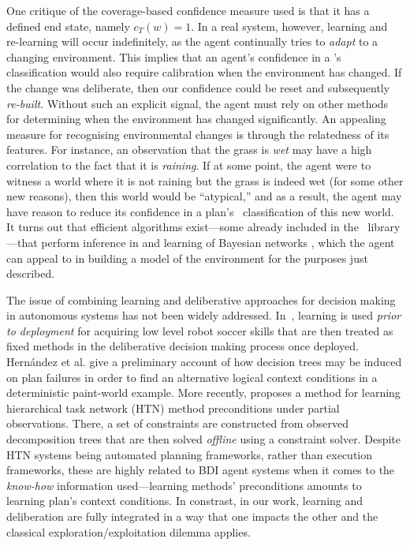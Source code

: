 One critique of the coverage-based confidence measure used is that it has a
defined end state, namely $c_T(w)=1$. In a real system, however, learning and
re-learning will occur indefinitely, as the agent continually tries to
\emph{adapt} to a changing environment. This implies that an agent's confidence
in a \dt's classification would also require calibration when the environment has
changed. If the change was deliberate, then our confidence could be reset and
subsequently \textit{re-built}. Without such an explicit signal, the agent must
rely on other methods for determining when the environment has changed
significantly.
An appealing measure for recognising environmental changes is through the
relatedness of its features. For instance, an observation that the grass is
\textit{wet} may have a high correlation to the fact that it is \textit{raining}.
If at some point, the agent were to witness a world where it is not raining but
the grass is indeed wet (for some other new reasons), then this world would be
``atypical,''  and as a result, the agent may have reason to reduce its
confidence in a plan's \dt\ classification of this new world.
It turns out that efficient algorithms exist---some already included in the
\weka\ library---that perform inference in and learning of Bayesian networks
\cite{Mitchell97:ML}, which the agent can appeal to in building a model of the
environment for the purposes just described.



The issue of combining learning and deliberative approaches for decision making
in autonomous systems has not been widely addressed.
In~\cite{Riedmiller01}, learning is used \emph{prior to deployment} for acquiring
low level robot soccer skills that are then treated as fixed methods in the
deliberative decision making process once deployed.
Hern\'andez et al. \cite{Hernandez04:Learning} give a preliminary account of how
decision trees may be induced on plan failures in order to find an alternative
logical context conditions in a deterministic paint-world example.
More recently, \cite{Zhuo09:Learning} proposes a method for learning hierarchical
task network (HTN) method preconditions under partial observations. There, a set
of  constraints are constructed from observed decomposition trees that are then
solved \emph{offline} using a constraint solver. Despite HTN systems being
automated planning frameworks, rather than execution frameworks, these are highly
related to BDI agent systems when it comes to the \emph{know-how} information
used---learning methods' preconditions amounts to learning plan's context
conditions.
In constrast, in our work, learning and deliberation are fully integrated in a
way that one impacts the other and the classical exploration/exploitation dilemma
applies.

